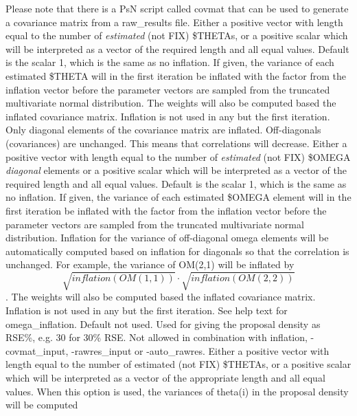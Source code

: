 \begin{optionlist}
Please note that there is a PsN script called covmat that can be used to generate a covariance matrix from a raw\_results file.
\nextopt
{}
Either a positive vector with length equal to the number of \emph{estimated} (not FIX) \$THETAs, or
a positive scalar which will be interpreted as a vector of the required length and all equal values.
Default is the scalar 1, which is the same as no inflation. 
If given, the variance
of each estimated \$THETA 
will in the first iteration be inflated with the factor from the inflation vector
before the parameter vectors
are sampled from the truncated multivariate normal distribution.
The weights will also be computed based the inflated covariance matrix. 
Inflation is not used in any but the first iteration.
Only diagonal elements of the covariance matrix are inflated. Off-diagonals (covariances)
are unchanged. This means that correlations will decrease.
\nextopt
{}
Either a positive vector with length equal to the number of \emph{estimated} (not FIX) 
\$OMEGA \emph{diagonal} elements
or
a positive scalar which will be interpreted as a vector of the required length and all equal values.
Default is the scalar 1, which is the same as no inflation. 
If given, the variance
of each estimated \$OMEGA element
will in the first iteration be inflated with the factor from the inflation vector
before the parameter vectors
are sampled from the truncated multivariate normal distribution. Inflation for
the variance of off-diagonal
omega elements will be automatically computed based on inflation for diagonals so that the correlation is unchanged.
For example, the variance of OM(2,1) will be inflated by 
\[
\sqrt{inflation(OM(1,1))}\cdot\sqrt{inflation(OM(2,2))}
\].
The weights will also be computed based the inflated covariance matrix. 
Inflation is not used in any but the first iteration.
\nextopt
{}
See help text for omega\_inflation.
\nextopt
{}
Default not used. Used for giving the proposal density as RSE\%, e.g. 30 for 30\% RSE.
Not allowed in combination with inflation, -covmat\_input, -rawres\_input or -auto\_rawres.
Either a positive vector with length equal to the number of estimated (not FIX) \$THETAs, or
a positive scalar which will be interpreted as a vector of the appropriate length and all equal values.
When this option is used, the variances of theta(i) in the proposal density will be computed

\end{optionlist}
